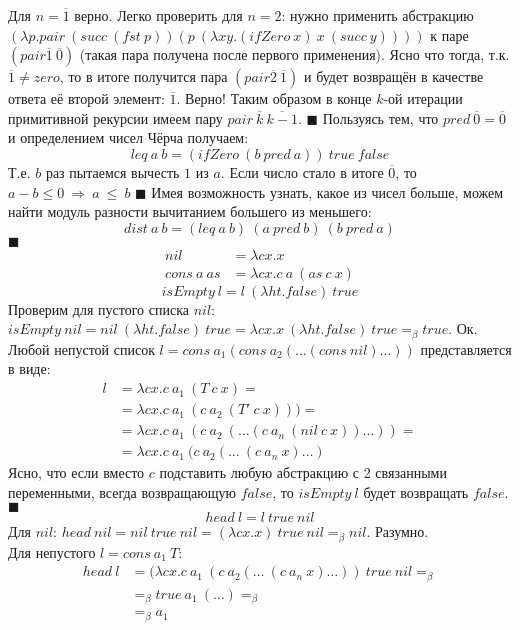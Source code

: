 Для $n=\overline{1}$ верно. 
Легко проверить для $n=2$: нужно применить абстракцию $(\lambda p.pair\ (succ\ (fst\ p))(p\ (\lambda xy.(ifZero\ x)\ x\ (succ\ y))))$ к паре 
$(pair \overline{1}\ \overline{0})$ (такая пара получена после первого применения). Ясно что тогда, т.к. $\overline{1} \neq zero$, то в итоге 
получится пара $(pair \overline{2}\ \overline{1})$ и будет возвращён в качестве ответа её второй элемент: $\overline{1}$. Верно! Таким образом в конце 
$k$-ой итерации примитивной рекурсии имеем пару $pair\ \overline{k}\ \overline{k-1}$. \hfill $\blacksquare$
Пользуясь тем, что $pred\ \overline{0} = \overline{0}$ и определением чисел Чёрча получаем:
\[
leq\ a\ b = (ifZero\ (b\ pred\ a))\ true\ false
\]
Т.е. $b$ раз пытаемся вычесть $1$ из $a$. Если число стало в итоге $\overline{0}$, то $a-b \leq 0\ \Rightarrow\ a\ \leq\ b$ \hfill $\blacksquare$
Имея возможность узнать, какое из чисел больше, можем найти модуль разности вычитанием большего из меньшего:
\[
dist\ a\ b = (leq\ a\ b)\ (a\ pred\ b)\ (b\ pred\ a)
\]
\hfill $\blacksquare$
\begin{align*}
	nil &= \lambda cx.x \\
	cons\ a\ as &= \lambda cx.c\ a\ (as\ c\ x)
\end{align*}
\[isEmpty\ l = l\ (\lambda ht.false)\ true\]
Проверим для пустого списка $nil$: $isEmpty\ nil = nil\ (\lambda ht.false)\ true = \lambda cx.x\ (\lambda ht.false)\ 
true =_\beta true$. Ок. Любой непустой список $l = cons\ a_1 (cons\ a_2 (\ldots(cons\ nil)\ldots))$ представляется в виде:
\begin{align}
l &= \lambda cx.c\ a_1\ (T\ c\ x)=\\
  &= \lambda cx.c\ a_1\ (c\ a_2\ (T'\ c\ x)))=\\
  &= \lambda cx.c\ a_1\ (c\ a_2\ (\ldots (c\ a_n\ (nil\ c\ x))\ldots))=\\
  &= \lambda cx.c\ a_1\ (c\ a_2(\ldots\ (c\ a_n\ x)\ldots) \label{eq:list}
\end{align}
Ясно, что если вместо $c$ подставить любую абстракцию с 2 связанными переменными, всегда возвращающую $false$, то $isEmpty\ l$ будет возвращать $false$. \hfill $\blacksquare$
\task{$head$}
\[ head\ l =  l\ true\ nil\]
Для $nil$: $head\ nil = nil\ true\ nil = (\lambda cx.x)\ true\ nil =_\beta nil$. Разумно.\\
Для непустого $l = cons\ a_1\ T$: 
\begin{align*}
head\ l &= (\lambda cx.c\ a_1\ (c\ a_2(\ldots\ (c\ a_n\ x)\ldots))\ true\ nil =_\beta \\
	    &=_\beta true\ a_1\ (\ldots) =_\beta \\
	    &=_\beta a_1
\end{align*}
